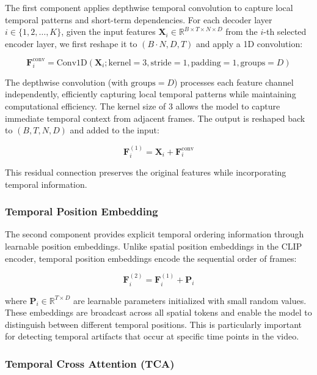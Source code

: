The first component applies depthwise temporal convolution to capture local temporal patterns and short-term dependencies. For each decoder layer $i \in \{1, 2, \ldots, K\}$, given the input features $\mathbf{X}_i \in \mathbb{R}^{B \times T \times N \times D}$ from the $i$-th selected encoder layer, we first reshape it to $(B \cdot N, D, T)$ and apply a 1D convolution:

\begin{equation}
\mathbf{F}_i^{\text{conv}} = \text{Conv1D}(\mathbf{X}_i; \text{kernel}=3, \text{stride}=1, \text{padding}=1, \text{groups}=D)
\end{equation}

The depthwise convolution (with $\text{groups}=D$) processes each feature channel independently, efficiently capturing local temporal patterns while maintaining computational efficiency. The kernel size of 3 allows the model to capture immediate temporal context from adjacent frames. The output is reshaped back to $(B, T, N, D)$ and added to the input:

\begin{equation}
\mathbf{F}_i^{(1)} = \mathbf{X}_i + \mathbf{F}_i^{\text{conv}}
\end{equation}

This residual connection preserves the original features while incorporating temporal information.

\subsubsection{Temporal Position Embedding}

The second component provides explicit temporal ordering information through learnable position embeddings. Unlike spatial position embeddings in the CLIP encoder, temporal position embeddings encode the sequential order of frames:

\begin{equation}
\mathbf{F}_i^{(2)} = \mathbf{F}_i^{(1)} + \mathbf{P}_i
\end{equation}

where $\mathbf{P}_i \in \mathbb{R}^{T \times D}$ are learnable parameters initialized with small random values. These embeddings are broadcast across all spatial tokens and enable the model to distinguish between different temporal positions. This is particularly important for detecting temporal artifacts that occur at specific time points in the video.

\subsubsection{Temporal Cross Attention (TCA)}

